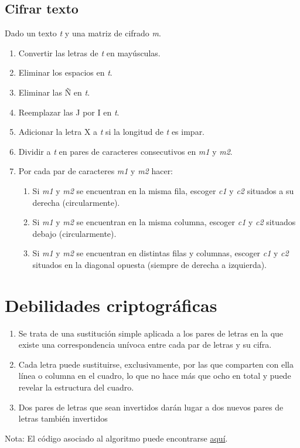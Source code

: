 \documentclass{article}
\begin{document}
    \subsection{Cifrar texto}
    Dado un texto \textit{t} y una matriz de cifrado \textit{m}.
    \begin{enumerate}
        \item Convertir las letras de  \textit{t} en mayúsculas.
        \item Eliminar los espacios en \textit{t}.
        \item Eliminar las Ñ en \textit{t}.
        \item Reemplazar las J por I en \textit{t}.
        \item Adicionar la letra X a \textit{t} si la longitud de \textit{t} es impar.
        \item Dividir a \textit{t} en pares de caracteres consecutivos en \textit{m1} y  \textit{m2}.
        \item Por cada par de caracteres \textit{m1} y \textit{m2} hacer:
            \begin{enumerate}
                \item Si \textit{m1} y \textit{m2} se encuentran en la misma fila, escoger \textit{c1} y \textit{c2} situados a su derecha (circularmente).
                \item Si \textit{m1} y \textit{m2} se encuentran en la misma columna, escoger \textit{c1} y \textit{c2} situados debajo (circularmente).
                \item Si \textit{m1} y \textit{m2} se encuentran en distintas filas y columnas, escoger \textit{c1} y \textit{c2} situados en la diagonal opuesta (siempre de derecha a izquierda).
            \end{enumerate}
    \end{enumerate}
    \section{Debilidades criptográficas}
    \begin{enumerate}
        \item Se trata de una sustitución simple aplicada a los pares de letras en la que existe una correspondencia unívoca entre cada par de letras y su cifra.
        \item Cada letra puede sustituirse, exclusivamente, por las que comparten con ella línea o columna en el cuadro, lo que no hace más que ocho en total y puede revelar la estructura del cuadro.
        \item Dos pares de letras que sean invertidos darán lugar a dos nuevos pares de letras también invertidos
    \end{enumerate}


    Nota: El código asociado al algoritmo puede encontrarse \href{https://github.com/Gaspect/playfair}{aquí}. 
\end{document}
